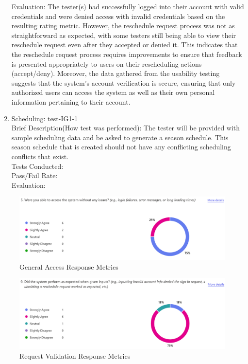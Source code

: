 \documentclass[12pt, titlepage]{article}
\begin{document}
\begin{enumerate}
  Evaluation: The tester(s) had successfully logged into their account with valid credentials
  and were denied access with invalid credentials based on the resulting rating metric. However,
  the reschedule request process was not as straightforward as expected, with some testers
  still being able to view their reschedule request even after they accepted or denied it.
  This indicates that the reschedule request process requires improvements to ensure that feedback
  is presented appropriately to users on their rescheduling actions (accept/deny). Moreover, the
  data gathered from the usability testing suggests that the system's account verification is
  secure, ensuring that only authorized users can access the system as well as their own personal
  information pertaining to their account.
  \item{Scheduling: test-IG1-1\\}
  Brief Description(How test was performed): The tester will be provided with sample
  scheduling data and be asked to generate a season schedule. This season schedule that is created
  should not have any conflicting scheduling conflicts that exist. \\
  Tests Conducted: \\
  Pass/Fail Rate: \\
  Evaluation: 
\end{enumerate}

\begin{figure}[H]
\centering
\includegraphics[scale=0.6]{survey_responses_access.png}
\caption{General Access Response Metrics}
\label{access}
\end{figure}

\begin{figure}[H]
\centering
\includegraphics[scale=0.6]{survey_responses_validate_inputs.png}
\caption{Request Validation Response Metrics}
\label{validate}
\end{figure}
	
\end{document}
